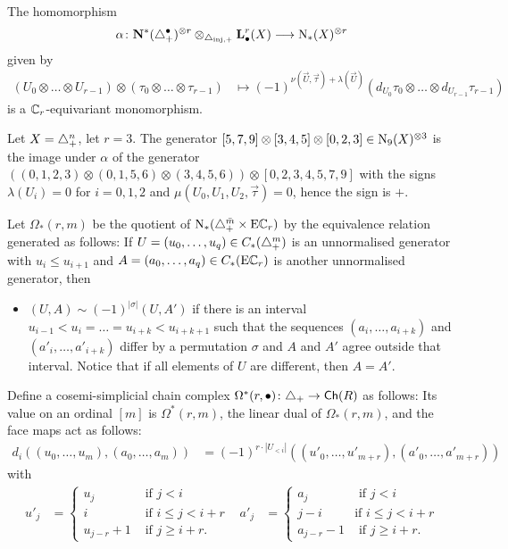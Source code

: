 \begin{lemma} The homomorphism
\[\alpha\colon \mathbf{N}^*(\triangle_{+}^\bullet)^{\otimes r}\otimes_{\triangle_{\mathrm{inj},+}} \operatorname{\mathbf{L}}^r_\bullet(X)\longrightarrow \operatorname{N}_*(X)^{\otimes r}\]
given by
\begin{align*}
(U_0\otimes \ldots\otimes U_{r-1})\otimes (\tau_0\otimes\ldots\otimes \tau_{r-1}) %
&\mapsto (-1)^{ \nu(\vec{U},\vec{\tau})+ \lambda(\vec{U})}(d_{U_0}\tau_0\otimes \ldots\otimes d_{U_{r-1}}\tau_{r-1})
\end{align*}
is a $\mathbb{C}_r$-equivariant monomorphism. %
\end{lemma}
\begin{example}\label{ex:102}
    Let $X = \triangle_{+}^n$, let $r= 3$. The generator $[5,7,9]\otimes [3,4,5]\otimes [0,2,3]\in \operatorname{N}_9(X)^{\otimes 3}$ is the image under $\alpha$ of the generator $((0,1,2,3)\otimes (0,1,5,6)\otimes (3,4,5,6))\otimes [0,2,3,4,5,7,9]$ with the signs $\lambda(U_i) = 0$ for $i=0,1,2$ and $\mu(U_0,U_1,U_2,\vec{\tau}) = 0$, hence the sign is $+$.
\end{example}
    Let $\Omega_*(r,m)$ be the quotient of $\operatorname{N}_*(\triangle_{+}^{{\bar{m}}}\times \mathrm{E}\mathbb{C}_r)$ by the equivalence relation generated as follows: If $U = (u_0,\ldots,u_q)\in C_*(\triangle_{+}^m)$ is an unnormalised generator with $u_i\leq u_{i+1}$ and $A = (a_0,\ldots,a_q)\in C_*(\mathrm{E}\mathbb{C}_r)$ is another unnormalised generator, then 
\begin{itemize}
    	\item $(U,A)\sim (-1)^{|\sigma|}(U,A')$ if there is an interval $u_{i-1}<u_i =\ldots =u_{i+k}<u_{i+k+1}$ such that the sequences $(a_i,\ldots,a_{i+k})$ and $(a'_i,\ldots,a'_{i+k})$ differ by a permutation $\sigma$ and $A$ and $A'$ agree outside that interval. Notice that if all elements of $U$ are different, then $A=A'$.
\end{itemize}
Define a cosemi-simplicial chain complex $\Omega^*(r,\bullet)\colon \triangle_{+}\to \mathsf{Ch}(R)$ as follows: Its value on an ordinal $[m]$ is $\Omega^*(r,m)$, the linear dual of $\Omega_*(r,m)$, and the face maps act as follows: \begin{align*}
    d_i((u_0,\ldots,u_m), (a_0,\ldots,a_m)) &= (-1)^{r\cdot |U_{<i}|}((u'_0,\ldots,u'_{m+r}),(a'_0,\ldots,a'_{m+r}))
\end{align*} 
with
\begin{align}\label{eq:Theta}
    u'_j &= 
        \begin{cases} 
            u_j &\text{ if $j<i$} \\ 
            i & \text{ if $i\leq j < i+r$} \\ 
            u_{j-r} + 1 & \text{ if $j\geq i+r$.}
        \end{cases} 
        &
	a'_j &= 
        \begin{cases} 
            a_j &\text{ if $j<i$} \\
            j-i & \text{if $i\leq j<i+r$} \\ 
            a_{j-r}-1 & \text{ if $j\geq i+r$.}
        \end{cases}
\end{align}
